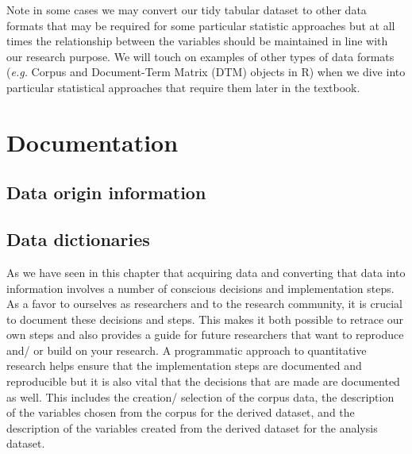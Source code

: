 \documentclass[
  letterpaper,
]{latex/krantz}
\begin{document}
\begin{tcolorbox}[enhanced jigsaw, colbacktitle=quarto-callout-warning-color!10!white, arc=.35mm, toprule=.15mm, breakable, colframe=quarto-callout-warning-color-frame, bottomrule=.15mm, opacitybacktitle=0.6, coltitle=black, titlerule=0mm, colback=white, toptitle=1mm, bottomtitle=1mm, title=\textcolor{quarto-callout-warning-color}{\faExclamationTriangle}\hspace{0.5em}{Tip}, rightrule=.15mm, leftrule=.75mm, opacityback=0, left=2mm]

Note in some cases we may convert our tidy tabular dataset to other data
formats that may be required for some particular statistic approaches
but at all times the relationship between the variables should be
maintained in line with our research purpose. We will touch on examples
of other types of data formats (\emph{e.g.} Corpus and Document-Term
Matrix (DTM) objects in R) when we dive into particular statistical
approaches that require them later in the textbook.

\end{tcolorbox}

\hypertarget{documentation}{%
\section{Documentation}\label{documentation}}

\hypertarget{data-origin-information}{%
\subsection{Data origin information}\label{data-origin-information}}

\hypertarget{data-dictionaries}{%
\subsection{Data dictionaries}\label{data-dictionaries}}

As we have seen in this chapter that acquiring data and converting that
data into information involves a number of conscious decisions and
implementation steps. As a favor to ourselves as researchers and to the
research community, it is crucial to document these decisions and steps.
This makes it both possible to retrace our own steps and also provides a
guide for future researchers that want to reproduce and/ or build on
your research. A programmatic approach to quantitative research helps
ensure that the implementation steps are documented and reproducible but
it is also vital that the decisions that are made are documented as
well. This includes the creation/ selection of the corpus data, the
description of the variables chosen from the corpus for the derived
dataset, and the description of the variables created from the derived
dataset for the analysis dataset.
\end{document}

